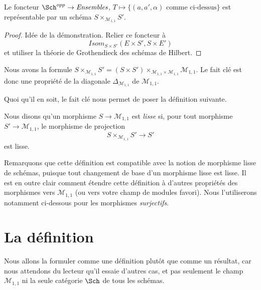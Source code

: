 \begin{lemma}
\label{lemma-key-fact}
Le foncteur $\Sch^{opp} \to \textit{Ensembles}$,
$T \mapsto \{(a, a', \alpha)\text{ comme ci-dessus}\}$
est représentable par un schéma $S \times_{\mathcal{M}_{1, 1}} S'$.
\end{lemma}

\begin{proof}
Idée de la démonstration. Relier ce foncteur à
$$
\mathit{Isom}_{S \times S'}(E \times S', S \times E')
$$
et utiliser la théorie de Grothendieck des schémas de Hilbert.
\end{proof}

\begin{remark}
\label{remark-diagonal}
Nous avons la formule
$S \times_{\mathcal{M}_{1, 1}} S' =
(S \times S')
\times_{\mathcal{M}_{1, 1} \times \mathcal{M}_{1, 1}}
\mathcal{M}_{1, 1}$.
Le fait clé est donc une propriété de la diagonale
$\Delta_{\mathcal{M}_{1, 1}}$ de $\mathcal{M}_{1, 1}$.
\end{remark}

\noindent
Quoi qu'il en soit, le fait clé nous permet de poser la définition suivante.

\begin{definition}
\label{definition-smooth}
Nous disons qu'un morphisme $S \to \mathcal{M}_{1, 1}$ est {\it lisse} si,
pour tout morphisme $S' \to \mathcal{M}_{1, 1}$, le morphisme de projection
$$
S \times_{\mathcal{M}_{1, 1}} S' \longrightarrow S'
$$
est lisse.
\end{definition}

\noindent
Remarquons que cette définition est compatible avec la notion de morphisme
lisse de schémas, puisque tout changement de base d'un morphisme lisse est
lisse. Il est en outre clair comment étendre cette définition à d'autres
propriétés des morphismes vers $\mathcal{M}_{1, 1}$ (ou vers votre champ de
modules favori). Nous l'utiliserons notamment ci-dessous pour les morphismes
{\it surjectifs}.





\section{La définition}
\label{section-definition}

\noindent
Nous allons la formuler comme une définition plutôt que comme un résultat,
car nous attendons du lecteur qu'il essaie d'autres cas, et pas seulement le
champ $\mathcal{M}_{1, 1}$ ni la seule catégorie $\Sch$ de tous les schémas.

